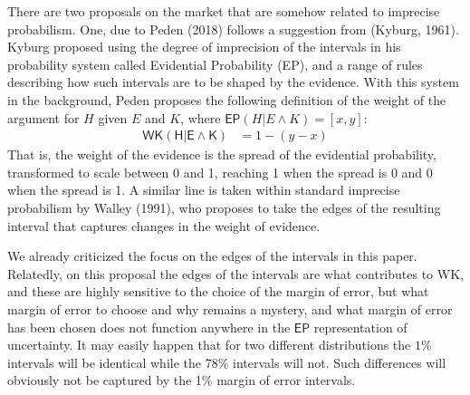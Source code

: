 \documentclass[
  10pt,
  dvipsnames,enabledeprecatedfontcommands]{scrartcl}
\begin{document}
There are two proposals on the market that are somehow related to
imprecise probabilism. One, due to Peden (2018) follows a suggestion
from (Kyburg, 1961). Kyburg proposed using the degree of imprecision of
the intervals in his probability system called Evidential Probability
(EP), and a range of rules describing how such intervals are to be
shaped by the evidence. With this system in the background, Peden
proposes the following definition of the weight of the argument for
\(H\) given \(E\) and \(K\), where
\(\mathsf{EP}(H \vert E \wedge K) = [x,y]\): \begin{align}
\tag{WK}  \mathsf{WK(H\vert E\wedge K)} & = 1 - (y-x)
\end{align} \noindent That is, the weight of the evidence is the spread
of the evidential probability, transformed to scale between 0 and 1,
reaching 1 when the spread is 0 and 0 when the spread is 1. A similar
line is taken within standard imprecise probabilism by Walley (1991),
who proposes to take the edges of the resulting interval that captures
changes in the weight of evidence.

We already criticized the focus on the edges of the intervals in this
paper. Relatedly, on this proposal the edges of the intervals are what
contributes to \textsf{WK}, and these are highly sensitive to the choice
of the margin of error, but what margin of error to choose and why
remains a mystery, and what margin of error has been chosen does not
function anywhere in the \(\mathsf{EP}\) representation of uncertainty.
It may easily happen that for two different distributions the \(1\%\)
intervals will be identical while the 78\% intervals will not. Such
differences will obviously not be captured by the 1\% margin of error
intervals.
\end{document}
